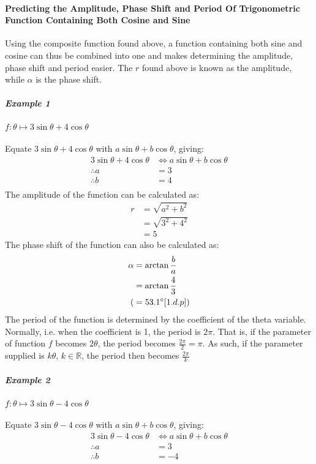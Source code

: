 \documentclass{article}
\begin{document}
        \paragraph{Predicting the Amplitude, Phase Shift and Period Of Trigonometric Function Containing Both Cosine and Sine} Using the composite function found above, a function containing both sine and cosine can thus be combined into one and makes determining the amplitude, phase shift and period easier. The $r$ found above is known as the amplitude, while $\alpha$ is the phase shift.
        \subparagraph{Example 1} $f:\theta \mapsto 3\sin{\theta} + 4\cos{\theta}$ \\\\
        Equate $3\sin{\theta} + 4\cos{\theta}$ with $a\sin{\theta} + b\cos{\theta}$, giving:
        \begin{align*}
        	3\sin{\theta} + 4\cos{\theta} &\Leftrightarrow a\sin{\theta} + b\cos{\theta} \\
        	\therefore a &= 3 \\
        	\therefore b &= 4 \\
        \end{align*}
        The amplitude of the function can be calculated as:
		\begin{align*}
			r &= \sqrt{a^2 + b^2} \\
			&= \sqrt{3^2 + 4^2} \\
			&= 5
		\end{align*}
		The phase shift of the function can also be calculated as:
		\begin{align*}
			\alpha &= \arctan{\frac{b}{a}} \\
			&= \arctan{\frac{4}{3}} \\
			(&= 53.1\degree [1.d.p]) 
		\end{align*}
		The period of the function is determined by the coefficient of the theta variable. Normally, i.e. when the coefficient is 1, the period is $2\pi$. That is, if the parameter of function $f$ becomes $2\theta$, the period becomes $\frac{2\pi}{2} = \pi$. As such, if the parameter supplied is $k\theta$, $k \in \mathbb{R}$, the period then becomes $\frac{2\pi}{k}$ \\
		\subparagraph{Example 2} $f:\theta \mapsto 3\sin{\theta} - 4\cos{\theta}$ \\\\
		Equate $3\sin{\theta} - 4\cos{\theta}$ with $a\sin{\theta} + b\cos{\theta}$, giving:
		\begin{align*}
		3\sin{\theta} - 4\cos{\theta} &\Leftrightarrow a\sin{\theta} + b\cos{\theta} \\
		\therefore a &= 3 \\
		\therefore b &= -4 \\
		\end{align*}
\end{document}
